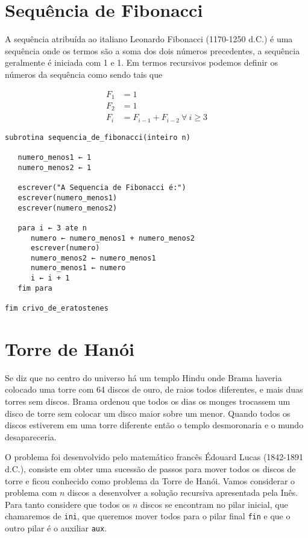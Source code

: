 \section{Sequência de Fibonacci}

A sequência atribuída ao italiano Leonardo Fibonacci (1170-1250 d.C.)
é uma sequência onde os termos são a soma dos dois
números precedentes, a sequência geralmente é iniciada com
1 e 1. Em termos recursivos podemos definir os números da sequência
como sendo tais que

\[
\begin{aligned}
F_1 &= 1 \\
F_2 &= 1 \\
F_i &= F_{i-1} + F_{i-2} ~\forall~i \ge 3
\end{aligned}
\]

\begin{lstlisting}[style=pseudo]
subrotina sequencia_de_fibonacci(inteiro n)

   numero_menos1 ← 1
   numero_menos2 ← 1

   escrever("A Sequencia de Fibonacci é:")
   escrever(numero_menos1)
   escrever(numero_menos2)

   para i ← 3 ate n
      numero ← numero_menos1 + numero_menos2
      escrever(numero)
      numero_menos2 ← numero_menos1
      numero_menos1 ← numero
      i ← i + 1
   fim para
      
fim crivo_de_eratostenes
\end{lstlisting}





\section{Torre de Hanói}

Se diz que no centro do universo há um templo Hindu onde Brama haveria
colocado uma torre com 64 discos de ouro, de raios todos diferentes, e mais duas torres sem discos.
Brama ordenou que todos os dias os monges trocassem um disco de torre sem
colocar um disco maior sobre um menor. Quando todos os discos estiverem em uma
torre diferente então o templo desmoronaria e o mundo desapareceria.

O problema foi desenvolvido pelo matemático francês Édouard Lucas (1842-1891 d.C.),
consiste em obter uma sucessão de passos para mover todos os discos de torre
e ficou conhecido como problema da Torre de Hanói. Vamos considerar o problema
com $n$ discos a desenvolver a solução recursiva apresentada pela Inês. \cite{RECURSIVIDADEEMACAO}
Para tanto considere que todos os $n$ discos se encontram no pilar inicial,
que chamaremos de \texttt{ini}, que queremos mover todos para o pilar
final \texttt{fin} e que o outro pilar é o auxiliar \texttt{aux}.

